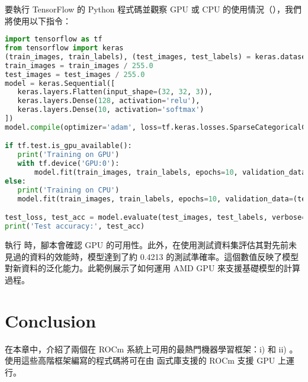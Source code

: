要執行 TensorFlow 的 Python 程式碼並觀察 GPU 或 CPU 的使用情況（），我們將使用以下指令：

\begin{lstlisting}[language=python, caption={使用Tensor進行訓練}, captionpos=t, label={lst:tsf_training}]
import tensorflow as tf
from tensorflow import keras
(train_images, train_labels), (test_images, test_labels) = keras.datasets.cifar10.load_data()
train_images = train_images / 255.0
test_images = test_images / 255.0
model = keras.Sequential([
   keras.layers.Flatten(input_shape=(32, 32, 3)),
   keras.layers.Dense(128, activation='relu'),
   keras.layers.Dense(10, activation='softmax')
])
model.compile(optimizer='adam', loss=tf.keras.losses.SparseCategoricalCrossentropy(from_logits=True), metrics=['accuracy'])

if tf.test.is_gpu_available():
   print('Training on GPU')
   with tf.device('GPU:0'):
       model.fit(train_images, train_labels, epochs=10, validation_data=(test_images, test_labels))
else:
   print('Training on CPU')
   model.fit(train_images, train_labels, epochs=10, validation_data=(test_images, test_labels))

test_loss, test_acc = model.evaluate(test_images, test_labels, verbose=2)
print('Test accuracy:', test_acc)
\end{lstlisting}

執行  時，腳本會確認 GPU 的可用性。此外，在使用測試資料集評估其對先前未見過的資料的效能時，模型達到了約 0.4213 的測試準確率。這個數值反映了模型對新資料的泛化能力。此範例展示了如何運用 AMD GPU 來支援基礎模型的計算過程。

\section{Conclusion}

在本章中，介紹了兩個在 ROCm 系統上可用的最熱門機器學習框架：i)  和 ii) 。使用這些高階框架編寫的程式碼將可在由  函式庫支援的 ROCm 支援 GPU 上運行。